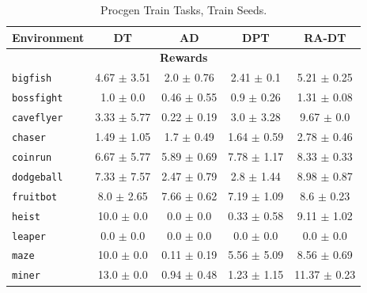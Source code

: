 \documentclass{article}
\begin{document}
\begin{table}[h]
    \centering
    \caption{Procgen Train Tasks, Train Seeds.}
    \begin{tabular}{@{} l c c c c@{}}
    \toprule
    \textbf{Environment} & \textbf{DT} & \textbf{AD} & \textbf{DPT} & \textbf{RA-DT} \\ \midrule
    \multicolumn{5}{c}{\textbf{Rewards}} \\
    \texttt{bigfish}     &                  4.67 $\pm$ 3.51 &                    2.0 $\pm$ 0.76 &                    2.41 $\pm$ 0.1 &            5.21 $\pm$ 0.25 \\
    \texttt{bossfight}   &                    1.0 $\pm$ 0.0 &                   0.46 $\pm$ 0.55 &                    0.9 $\pm$ 0.26 &            1.31 $\pm$ 0.08 \\
    \texttt{caveflyer}   &                  3.33 $\pm$ 5.77 &                   0.22 $\pm$ 0.19 &                    3.0 $\pm$ 3.28 &             9.67 $\pm$ 0.0 \\
    \texttt{chaser}      &                  1.49 $\pm$ 1.05 &                    1.7 $\pm$ 0.49 &                   1.64 $\pm$ 0.59 &            2.78 $\pm$ 0.46 \\
    \texttt{coinrun}     &                  6.67 $\pm$ 5.77 &                   5.89 $\pm$ 0.69 &                   7.78 $\pm$ 1.17 &            8.33 $\pm$ 0.33 \\
    \texttt{dodgeball}   &                  7.33 $\pm$ 7.57 &                   2.47 $\pm$ 0.79 &                    2.8 $\pm$ 1.44 &            8.98 $\pm$ 0.87 \\
    \texttt{fruitbot}    &                   8.0 $\pm$ 2.65 &                   7.66 $\pm$ 0.62 &                   7.19 $\pm$ 1.09 &             8.6 $\pm$ 0.23 \\
    \texttt{heist}       &                   10.0 $\pm$ 0.0 &                     0.0 $\pm$ 0.0 &                   0.33 $\pm$ 0.58 &            9.11 $\pm$ 1.02 \\
    \texttt{leaper}      &                    0.0 $\pm$ 0.0 &                     0.0 $\pm$ 0.0 &                     0.0 $\pm$ 0.0 &              0.0 $\pm$ 0.0 \\
    \texttt{maze}        &                   10.0 $\pm$ 0.0 &                   0.11 $\pm$ 0.19 &                   5.56 $\pm$ 5.09 &            8.56 $\pm$ 0.69 \\
    \texttt{miner}      &                   13.0 $\pm$ 0.0 &                   0.94 $\pm$ 0.48 &                   1.23 $\pm$ 1.15 &           11.37 $\pm$ 0.23 \\

\end{tabular}
\end{table}
\end{document}
